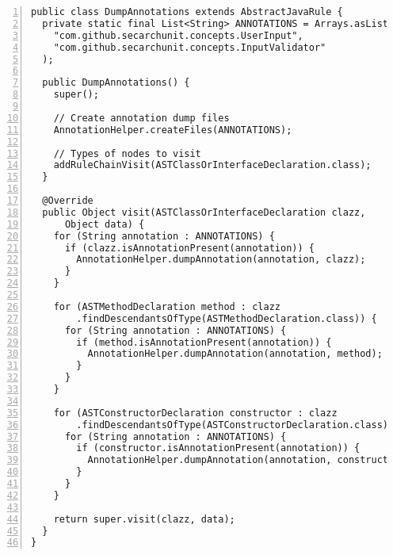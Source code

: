 \begin{lstlisting}[caption={AnnotationDumper, a rule that traverses all classes and dumps their annotations into a text file using AnnotationHelper.}, captionpos=b, label=lst:pmd_annotation_dumper, numbers=left, showstringspaces=false]
public class DumpAnnotations extends AbstractJavaRule {
  private static final List<String> ANNOTATIONS = Arrays.asList(
    "com.github.secarchunit.concepts.UserInput",
    "com.github.secarchunit.concepts.InputValidator"
  );

  public DumpAnnotations() {
    super();

    // Create annotation dump files
    AnnotationHelper.createFiles(ANNOTATIONS);

    // Types of nodes to visit
    addRuleChainVisit(ASTClassOrInterfaceDeclaration.class);
  }

  @Override
  public Object visit(ASTClassOrInterfaceDeclaration clazz,
      Object data) {
    for (String annotation : ANNOTATIONS) {
      if (clazz.isAnnotationPresent(annotation)) {
        AnnotationHelper.dumpAnnotation(annotation, clazz);
      }
    }

    for (ASTMethodDeclaration method : clazz
        .findDescendantsOfType(ASTMethodDeclaration.class)) {
      for (String annotation : ANNOTATIONS) {
        if (method.isAnnotationPresent(annotation)) {
          AnnotationHelper.dumpAnnotation(annotation, method);
        }
      }
    }

    for (ASTConstructorDeclaration constructor : clazz
        .findDescendantsOfType(ASTConstructorDeclaration.class)) {
      for (String annotation : ANNOTATIONS) {
        if (constructor.isAnnotationPresent(annotation)) {
          AnnotationHelper.dumpAnnotation(annotation, constructor);
        }
      }
    }

    return super.visit(clazz, data);
  }
}
\end{lstlisting}

